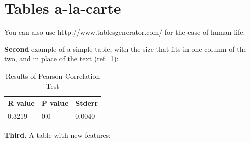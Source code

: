 \documentclass{sig-alternate-05-2015}
\begin{document}
\section{Tables a-la-carte}\label{tabs}

You can also use http://www.tablesgenerator.com/ for the ease of human life.

\textbf{Second} example of a simple table, with the size that fits in one column of the two, and in place of the text (ref.~\ref{tab2}):
\begin{table}[htbp]
\centering
    \caption{Results of Pearson Correlation Test}
    \label{tab2}
\begin{tabular}{|l|l|l|}
    \hline
    \textbf{R value} & \textbf{P value} & \textbf{Stderr} \\ \hline
    0.3219           & 0.0              & 0.0040          \\ \hline
    \end{tabular}
\end{table}

\textbf{Third.} A table with new features:
\end{document}
